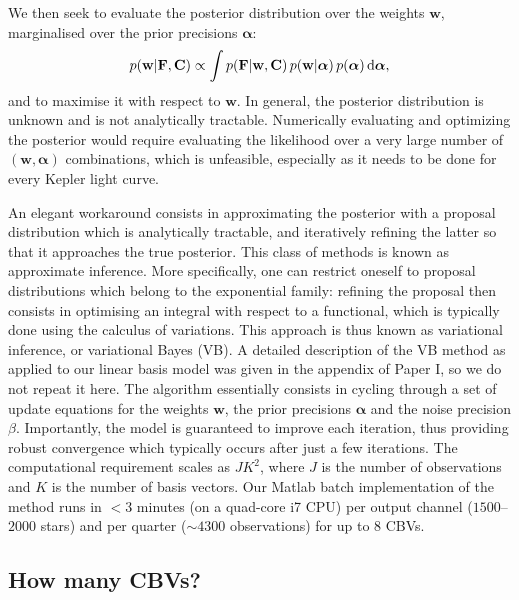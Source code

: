 \documentclass[useAMS,usenatbib]{mn2e}
\begin{document}
We then seek to evaluate the posterior distribution over the weights
$\mathbf{w}$, marginalised over the prior precisions
$\boldsymbol{\alpha}$:
\begin{equation}
p(\mathbf{w}|\mathbf{F},\mathbf{C}) \propto \int
p(\mathbf{F}|\mathbf{w},\mathbf{C})  \, p(\mathbf{w}|\boldsymbol{\alpha}) \, p(\boldsymbol{\alpha}) \, {\rm d}\boldsymbol{\alpha},
\end{equation} 
and to maximise it with respect to $\mathbf{w}$. In general, the
posterior distribution is unknown and is not analytically
tractable. Numerically evaluating and optimizing the posterior would
require evaluating the likelihood over a very large number
of $(\mathbf{w},\boldsymbol{\alpha})$ combinations, which is
unfeasible, especially as it needs to be done for every Kepler
light curve. 

An elegant workaround consists in approximating the posterior with a
proposal distribution which is analytically tractable, and iteratively
refining the latter so that it approaches the true posterior. This
class of methods is known as approximate inference. More specifically,
one can restrict oneself to proposal distributions which belong to the
exponential family: refining the proposal then consists in optimising
an integral with respect to a functional, which is typically done
using the calculus of variations. This approach is thus known as
variational inference, or variational Bayes (VB). A detailed
description of the VB method as applied to our linear basis model was
given in the appendix of Paper I, so we do not repeat it here. The
algorithm essentially consists in cycling through a set of update
equations for the weights $\mathbf{w}$, the prior precisions
$\boldsymbol{\alpha}$ and the noise precision $\beta$. Importantly,
the model is guaranteed to improve each iteration, thus providing robust
convergence which typically occurs after just a few 
iterations. The computational requirement scales as $JK^2$, where $J$
is the number of observations and $K$ is the number of basis
vectors. Our {\sc Matlab} batch implementation of the method runs in
$< 3$ minutes (on a quad-core i7 CPU) per output channel ($1500$--$2000$
stars) and per quarter ($\sim 4300$ observations) for up to 8 CBVs. 

\subsection{How many CBVs?}
\end{document}
